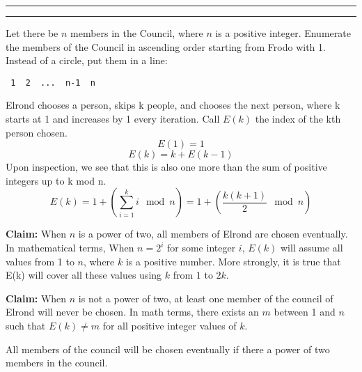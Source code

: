\documentclass[11pt]{article}
\newcounter{questionCounter}
\newcounter{partCounter}[questionCounter]
\newenvironment{question}[2][\arabic{questionCounter}]{%
    \setcounter{partCounter}{0}%
    \vspace{.25in} \hrule \vspace{0.5em}%
        \noindent{\bf #2}%
    \vspace{0.8em} \hrule \vspace{.10in}%
    \addtocounter{questionCounter}{1}%
}{}
\begin{document}
\begin{question}{The Council of Elrond}

Let there be $n$ members in the Council, where $n$ is a positive integer.
Enumerate the members of the Council in ascending order starting from Frodo with 1.
Instead of a circle, put them in a line:

\verb| 1  2  ...  n-1  n |

Elrond chooses a person, skips k people, and chooses the next person,
where k starts at 1 and increases by 1 every iteration.
Call $E(k)$ the index of the kth person chosen.
$$E(1) = 1$$
$$E(k) = k + E(k-1)$$
Upon inspection, we see that this is also one more than the sum of positive integers up to k mod n.
$$ E(k) = 1+(\sum_{i=1}^{k} i \mod n) = 1 + (\frac{k(k+1)}{2} \mod n)$$

\textbf{Claim:} When $n$ is a power of two, all members of Elrond are chosen eventually.
In mathematical terms, When $n = 2^i$ for some integer $i$, $E(k)$ will assume all values
from 1 to $n$, where $k$ is a positive number. More strongly, it is true that E(k) will cover
all these values using $k$ from $1$ to $2k$.

\textbf{Claim:} When $n$ is not a power of two, at least one member of the council of Elrond 
will never be chosen. In math terms, there exists an $m$ between 1 and $n$ such that
$E(k) \neq m$ for all positive integer values of $k$.


All members of the council will be chosen eventually if there a power of two members in the council.
\end{question}
\end{document}
